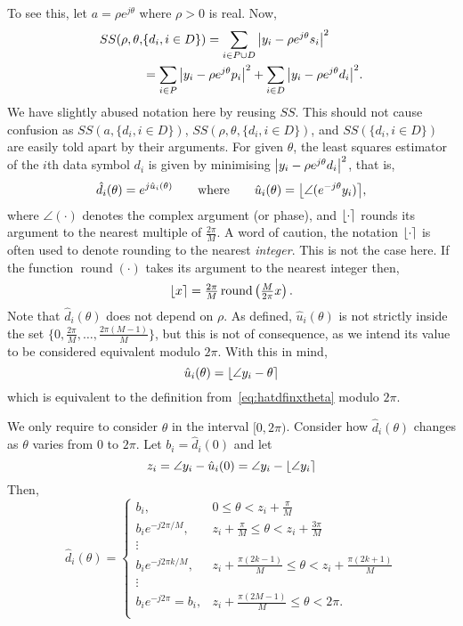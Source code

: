 \documentclass[journal]{IEEEtran}
\begin{document}
To see this, let $a = \rho e^{j\theta}$ where $\rho > 0$ is real.  Now,
\begin{align}
SS(\rho, \theta, &\{d_i, i \in D\}) = \sum_{i \in P \cup D} {\left\vert  y_i - \rho e^{j\theta} s_i  \right\vert}^2  \nonumber \\
&= \sum_{i \in P} {\left\vert  y_i - \rho e^{j\theta} p_i  \right\vert}^2 + \sum_{i \in D} {\left\vert  y_i - \rho e^{j\theta} d_i  \right\vert}^2. \label{eq:SSallparams}
\end{align}
We have slightly abused notation here by reusing $SS$. This should not cause confusion as $SS(a, \{d_i, i \in D\})$, $SS(\rho, \theta, \{d_i, i \in D\})$, and $SS(\{d_i, i \in D\})$ are easily told apart by their arguments.  For given $\theta$, the least squares estimator of the $i$th data symbol $d_i$ is given by minimising ${\left\vert  y_i - \rho e^{j\theta} d_i  \right\vert}^2$, that is,
\begin{equation}\label{eq:hatdfinxtheta}
\hat{d}_i(\theta) = e^{j\hat{u}_i(\theta)} \qquad \text{where} \qquad \hat{u}_i(\theta) = {\left\lfloor \angle( e^{-j\theta}y_i) \right\rceil},
\end{equation}
where $\angle(\cdot)$ denotes the complex argument (or phase), and ${\left\lfloor \cdot \right\rceil}$ rounds its argument to the nearest multiple of $\frac{2\pi}{M}$.  A word of caution, the notation ${\left\lfloor \cdot \right\rceil}$ is often used to denote rounding to the nearest \emph{integer}.  This is not the case here.  If the function $\operatorname{round}(\cdot)$ takes its argument to the nearest integer then,
\[
{\left\lfloor x \right\rceil} = \tfrac{2\pi}{M}\operatorname{round}\left(\tfrac{M}{2\pi}x\right).
\] 
Note that $\hat{d}_i(\theta)$ does not depend on $\rho$.  As defined, $\hat{u}_i(\theta)$ is not strictly inside the set $\{0, \tfrac{2\pi}{M}, \dots, \tfrac{2\pi(M-1)}{M}\}$, but this is not of consequence, as we intend its value to be considered equivalent modulo $2\pi$.  With this in mind,
\[
\hat{u}_i(\theta) = {\left\lfloor \angle{y_i} - \theta  \right\rceil}
\]
which is equivalent to the definition from~\eqref{eq:hatdfinxtheta} modulo $2\pi$.

We only require to consider $\theta$ in the interval $[0, 2\pi)$.  Consider how $\hat{d}_i(\theta)$ changes as $\theta$ varies from $0$ to $2\pi$.  Let $b_i = \hat{d}_i(0)$ and let 
\[
z_i = \angle{y_i} - \hat{u}_i(0) = \angle{y_i} - {\left\lfloor \angle{y_i} \right\rceil}
\]
Then,
\begin{equation}\label{eq:uicombos}
\hat{d}_i(\theta) = 
\begin{cases}
b_i, &  0 \leq \theta < z_i + \frac{\pi}{M} \\
b_i e^{-j2\pi/M}, & z_i + \frac{\pi}{M} \leq \theta < z_i + \frac{3\pi}{M} \\ 
\vdots & \\
b_i e^{-j2\pi k /M}, & z_i + \frac{\pi(2k - 1)}{M} \leq \theta < z_i + \frac{\pi(2k + 1)}{M}  \\ 
\vdots & \\
b_i e^{-j2\pi} = b_i, &  z_i + \frac{\pi(2M - 1)}{M} \leq \theta < 2\pi. \\
\end{cases}
\end{equation}
\end{document}
